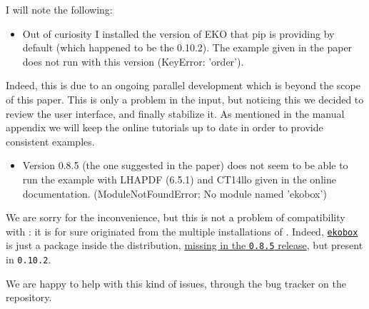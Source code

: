\documentclass[a4paper,11pt]{article}
\begin{document}
\begin{response}{
  I will note the following:

  \begin{itemize}
    \item Out of curiosity I installed the version of EKO that pip is providing
      by default (which happened to be the 0.10.2). The example given in the
      paper does not run with this version (KeyError: 'order').
  \end{itemize}
}
Indeed, this is due to an ongoing parallel development which is beyond the
scope of this paper.
This is only a problem in the input, but noticing this we decided to review the
user interface, and finally stabilize it.
As mentioned in the manual appendix we will keep the online tutorials 
up to date in order to provide consistent examples.
\end{response}

\begin{response}{
  \begin{itemize}
    \item Version 0.8.5 (the one suggested in the paper) does not seem to be able
      to run the example with LHAPDF (6.5.1) and CT14llo given in the online
      documentation. (ModuleNotFoundError: No module named 'ekobox')
  \end{itemize}
}
We are sorry for the inconvenience, but this is not a problem of compatibility
with \lhapdf: it is for sure originated from the multiple installations of \eko.
Indeed, \href{https://github.com/N3PDF/eko/tree/master/src}{\texttt{ekobox}} is
just a package inside the \eko{} distribution,
\href{https://github.com/N3PDF/eko/tree/v0.8.5/src}{missing in the
\texttt{0.8.5} release}, but present in \texttt{0.10.2}.

We are happy to help with this kind of issues, through the bug tracker on the
repository.
\end{response}
\end{document}
